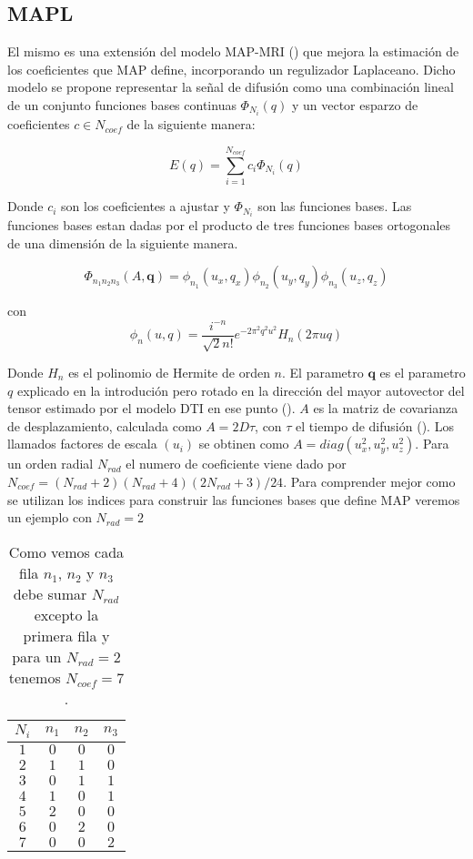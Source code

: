 \documentclass[11pt,a4paper,twoside]{tesis}
\begin{document}
\subsection{MAPL}

El mismo es una extensi\'on del modelo MAP-MRI (\citet{Ozarslan2013}) que mejora 
la estimaci\'on de los coeficientes que MAP define, incorporando un regulizador Laplaceano. 
Dicho modelo se propone representar la se\~nal de difusi\'on como una combinaci\'on lineal de un 
conjunto funciones bases continuas $\Phi_{N_i}(q)$ y un vector esparzo de coeficientes $c \in 
N_{coef}$ de la siguiente manera:

\begin{equation}
    E(q) = \sum_{i=1}^{N_{coef}} c_i \Phi_{N_i}(q)
\end{equation}

Donde ${c_i}$ son los coeficientes a ajustar y $\Phi_{N_i}$ son las funciones bases. Las funciones 
bases estan dadas por el producto de tres funciones bases ortogonales de una dimensi\'on de la 
siguiente manera.

$$
    \Phi_{n_1 n_2 n_3} (A, \mathbf{q}) = \phi_{n_1}(u_x, q_x) \phi_{n_2}(u_y, q_y) 
\phi_{n_3}(u_z, q_z)$$
  
con   
$$\phi_n(u, q) = \frac{i^{-n}}{\sqrt{2} n!} e^{-2\pi^2q^2u^2} H_n(2\pi u q)$$

Donde $H_n$ es el polinomio de Hermite de orden $n$. El parametro $\mathbf{q}$ es el parametro $q$ 
explicado en la introduci\'on pero rotado en la direcci\'on del mayor autovector del tensor 
estimado por el modelo DTI en ese punto (\citep{Basser1994}). $A$ es la matriz de 
covarianza de desplazamiento, calculada como $A=2D\tau$, con $\tau$ el tiempo de difusi\'on 
(\citep{Basser2002}). Los llamados factores de escala $(u_i)$ se obtinen como 
$A=diag(u_x^2,u_y^2,u_z^2)$. Para un orden radial $N_{rad}$ el numero de coeficiente viene dado por 
$N_{coef} = (N_{rad}+2)(N_{rad}+4)(2N_{rad}+3)/24$. Para comprender mejor como se utilizan los 
indices para construir las funciones bases que define MAP veremos un ejemplo con $N_{rad}=2$

\begin{table}[H]
\begin{tabular}{|c|c|c|c|}
\hline
$N_i$ & $n_1$ & $n_2$ & $n_3$ \\
\hline
$1$ & $0$ & $0$ & $0$\\
$2$ & $1$ & $1$ & $0$\\
$3$ & $0$ & $1$ & $1$\\
$4$ & $1$ & $0$ & $1$\\
$5$ & $2$ & $0$ & $0$\\
$6$ & $0$ & $2$ & $0$\\
$7$ & $0$ & $0$ & $2$\\
\hline
\end{tabular}

\caption{Como vemos cada fila $n_1$, $n_2$ y $n_3$ debe sumar $N_{rad}$ excepto la primera fila y 
para un $N_{rad}=2$ tenemos $N_{coef}=7$.}

\label{tab:res}
\end{table}
\end{document}
